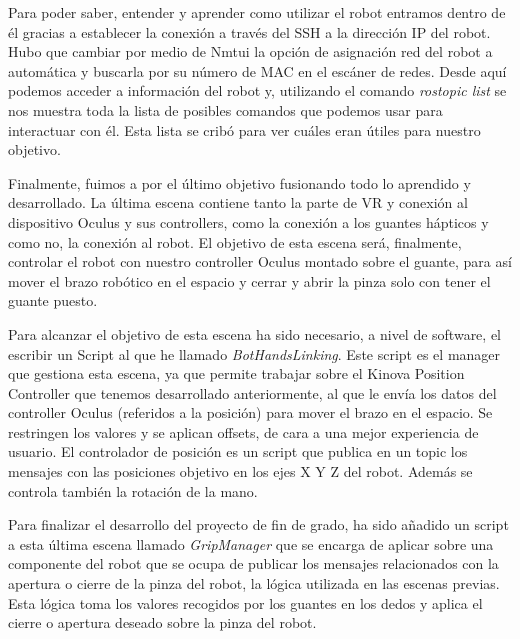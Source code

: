 Para poder saber, entender y aprender como utilizar el robot entramos dentro de él gracias a establecer la conexión a través del SSH\cite{SSH} a la dirección IP del robot. Hubo que cambiar por medio de Nmtui la opción de asignación red del robot a automática y buscarla por su número de MAC en el escáner de redes. Desde aquí podemos acceder a información del robot y, utilizando el comando \textit{rostopic list} se nos muestra toda la lista de posibles comandos que podemos usar para interactuar con él. Esta lista se cribó para ver cuáles eran útiles para nuestro objetivo.

Finalmente, fuimos a por el último objetivo fusionando todo lo aprendido y desarrollado. La última escena contiene tanto la parte de VR y conexión al dispositivo Oculus y sus controllers, como la conexión a los guantes hápticos y como no, la conexión al robot. El objetivo de esta escena será, finalmente, controlar el robot con nuestro controller Oculus\cite{Quest2} montado sobre el guante, para así mover el brazo robótico en el espacio y cerrar y abrir la pinza solo con tener el guante puesto. 

Para alcanzar el objetivo de esta escena ha sido necesario, a nivel de software, el escribir un Script al que he llamado \textit{BotHandsLinking}. Este script es el manager que gestiona esta escena, ya que permite trabajar sobre el Kinova Position Controller que tenemos desarrollado anteriormente, al que le envía los datos del controller Oculus (referidos a la posición) para mover el brazo en el espacio. Se restringen los valores y se aplican offsets, de cara a una mejor experiencia de usuario. El controlador de posición es un script que publica en un topic los mensajes con las posiciones objetivo en los ejes X Y Z del robot.
Además se controla también la rotación de la mano.

Para finalizar el desarrollo del proyecto de fin de grado, ha sido añadido un script a esta última escena llamado \textit{GripManager} que se encarga de aplicar sobre una componente del robot que se ocupa de publicar los mensajes relacionados con la apertura o cierre de la pinza del robot, la lógica utilizada en las escenas previas. Esta lógica toma los valores recogidos por los guantes en los dedos y aplica el cierre o apertura deseado sobre la pinza del robot.

